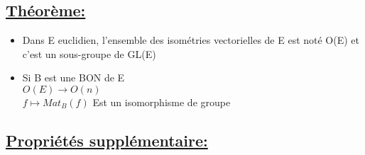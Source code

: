 \documentclass{article}
\begin{document}
\newpage

\subsection{\underline{Théorème:}} 
\begin{itemize}
    \item  Dans E euclidien, l'ensemble des isométries vectorielles de E est noté O(E) et c'est un sous-groupe de GL(E)
    \item Si B est une BON de E\\
    $O(E) \rightarrow O(n)$\\
    $f \longmapsto Mat_B(f)$
    Est un isomorphisme de groupe
\end{itemize}

\subsection{\underline{Propriétés supplémentaire:}} 
\end{document}
